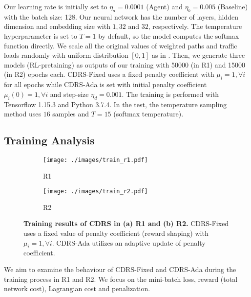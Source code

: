 Our learning rate is initially set to $\eta_a = 0.0001$ (Agent) and $\eta_b = 0.005$ (Baseline) with the batch size: 128. Our neural network has the number of layers, hidden dimension and embedding size with $1, 32$ and $ 32$, respectively. The temperature hyperparameter is set to $T=1$ by default, so the model computes the softmax function directly. We scale all the original values of weighted paths and traffic loads randomly with uniform distribution $[0,1]$ as in \cite{neural_bello}. Then, we generate three models (RL-pretaining) as outputs of our training with 50000 (in R1) and 15000 (in R2) epochs each. CDRS-Fixed uses a fixed penalty coefficient with $\mu_i =1, \forall i$ for all epochs while CDRS-Ada is set with initial penalty coefficient $\mu_i (0) =1, \forall i$ and step-size $\eta_d = 0.001$. The training is performed with Tensorflow 1.15.3 and Python 3.7.4. In the test, the temperature sampling method uses $16$ samples and $T = 15 $ (softmax temperature). 

\vspace{-2mm}
\subsection{Training Analysis}

\begin{figure*}[t] 
	\centering
	\begin{subfigure}[t]{.49\textwidth} %
		\centering
		\texttt{[image: ./images/train\_r1.pdf]}
		\small\caption{\small R1}
	\end{subfigure}
	\begin{subfigure}[t]{.49\textwidth} %
		\centering
		\texttt{[image: ./images/train\_r2.pdf]}
		\small\caption{\small R2}
	\end{subfigure}		
	\caption{\small \textbf{Training results of CDRS in (a) R1 and (b) R2.} CDRS-Fixed uses a fixed value of penalty coefficient (reward shaping) with $\mu_i = 1, \forall i$. CDRS-Ada utilizes an adaptive update of penalty coefficient.} 
	\label{fig:res_train} 
	\vspace{-3mm}
\end{figure*}

We aim to examine the behaviour of CDRS-Fixed and CDRS-Ada during the training process in R1 and R2. We focus on the mini-batch loss, reward (total network cost), Lagrangian cost and penalization.  

